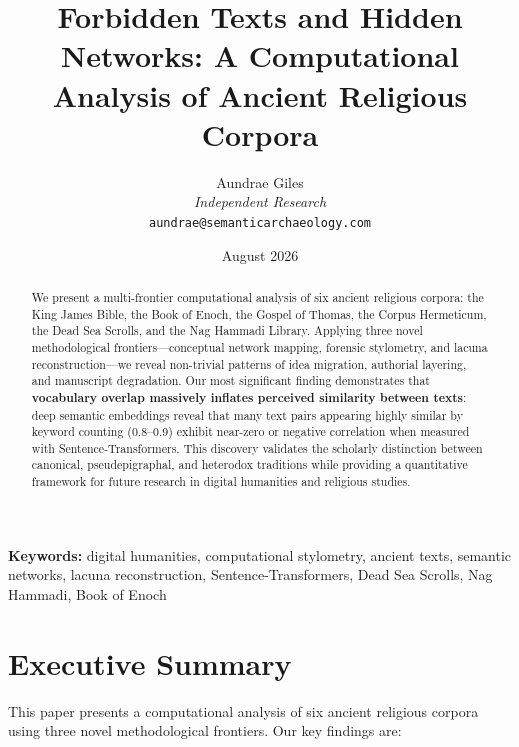 \documentclass[11pt]{article}
\title{Forbidden Texts and Hidden Networks: A Computational Analysis of Ancient Religious Corpora}
\author{Aundrae Giles\\
  \textit{Independent Research}\\
  \texttt{aundrae@semanticarchaeology.com}
}
\date{August 2026}
\begin{document}
\maketitle

\begin{abstract}
We present a multi-frontier computational analysis of six ancient religious corpora: the King James Bible, the Book of Enoch, the Gospel of Thomas, the Corpus Hermeticum, the Dead Sea Scrolls, and the Nag Hammadi Library. Applying three novel methodological frontiers---conceptual network mapping, forensic stylometry, and lacuna reconstruction---we reveal non-trivial patterns of idea migration, authorial layering, and manuscript degradation. Our most significant finding demonstrates that \textbf{vocabulary overlap massively inflates perceived similarity between texts}: deep semantic embeddings reveal that many text pairs appearing highly similar by keyword counting (0.8--0.9) exhibit near-zero or negative correlation when measured with Sentence-Transformers. This discovery validates the scholarly distinction between canonical, pseudepigraphal, and heterodox traditions while providing a quantitative framework for future research in digital humanities and religious studies.
\end{abstract}

\textbf{Keywords:} digital humanities, computational stylometry, ancient texts, semantic networks, lacuna reconstruction, Sentence-Transformers, Dead Sea Scrolls, Nag Hammadi, Book of Enoch

\section{Executive Summary}

This paper presents a computational analysis of six ancient religious corpora using three novel methodological frontiers. Our key findings are:
\end{document}
